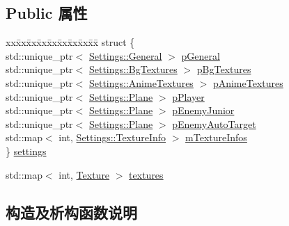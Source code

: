 \subsection*{Public 属性}
\begin{DoxyCompactItemize}
\item 
\begin{tabbing}
xx\=xx\=xx\=xx\=xx\=xx\=xx\=xx\=xx\=\kill
struct \{\\
\>std::unique\_ptr$<$ \hyperlink{struct_settings_1_1_general}{Settings::General} $>$ \hyperlink{class_resources_loader_a65888b4ea57a744c09dc0c9e22f9f186}{pGeneral}\\
\>std::unique\_ptr$<$ \hyperlink{struct_settings_1_1_bg_textures}{Settings::BgTextures} $>$ \hyperlink{class_resources_loader_aada194614a803df2a3680e5c5992a18a}{pBgTextures}\\
\>std::unique\_ptr$<$ \hyperlink{struct_settings_1_1_anime_textures}{Settings::AnimeTextures} $>$ \hyperlink{class_resources_loader_a72df15c8b925035fda4edfeb52830d82}{pAnimeTextures}\\
\>std::unique\_ptr$<$ \hyperlink{struct_settings_1_1_plane}{Settings::Plane} $>$ \hyperlink{class_resources_loader_ae874a55d363c3cb651f36e47570d30a9}{pPlayer}\\
\>std::unique\_ptr$<$ \hyperlink{struct_settings_1_1_plane}{Settings::Plane} $>$ \hyperlink{class_resources_loader_a150dacb6180f32ab8fafadcefdc65f96}{pEnemyJunior}\\
\>std::unique\_ptr$<$ \hyperlink{struct_settings_1_1_plane}{Settings::Plane} $>$ \hyperlink{class_resources_loader_a99ac5605a8b7fedb9c79b3f6b6d310cb}{pEnemyAutoTarget}\\
\>std::map$<$ int, \hyperlink{struct_settings_1_1_texture_info}{Settings::TextureInfo} $>$ \hyperlink{class_resources_loader_ae364e855ac860a1404ddf324b0ef0300}{mTextureInfos}\\
\} \hyperlink{class_resources_loader_a2310f32324c20d8294cfbfd893f1c2d9}{settings}\\

\end{tabbing}\item 
std\+::map$<$ int, \hyperlink{struct_texture}{Texture} $>$ \hyperlink{class_resources_loader_a5b18435b040ae9562a84570712be922c}{textures}
\end{DoxyCompactItemize}


\subsection{构造及析构函数说明}
\mbox{\label{class_resources_loader_a571b6232d8f1dc1cf94ec752c984a834}} 
